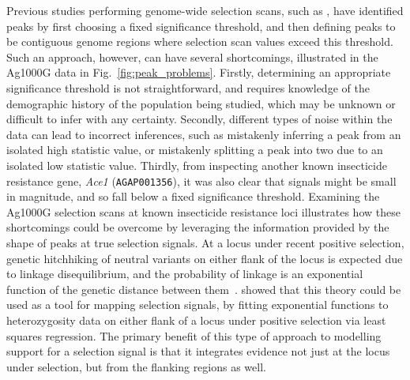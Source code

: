 \documentclass[a4paper,11pt,abstracton,hidelinks]{scrartcl}
\begin{document}
Previous studies performing genome-wide selection scans, such as \textcite{Garud2015}, have identified peaks by first choosing a fixed significance threshold, and then defining peaks to be contiguous genome regions where selection scan values exceed this threshold.
%
Such an approach, however, can have several shortcomings, illustrated in the Ag1000G data in Fig.~\ref{fig:peak_problems}.
%
Firstly, determining an appropriate significance threshold is not straightforward, and requires knowledge of the demographic history of the population being studied, which may be unknown or difficult to infer with any certainty.
%
Secondly, different types of noise within the data can lead to incorrect inferences, such as mistakenly inferring a peak from an isolated high statistic value, or mistakenly splitting a peak into two due to an isolated low statistic value.
%
Thirdly, from inspecting another known insecticide resistance gene, \textit{Ace1} (\texttt{AGAP001356}), it was also clear that signals might be small in magnitude, and so fall below a fixed significance threshold.
%
Examining the Ag1000G selection scans at known insecticide resistance loci illustrates how these shortcomings could be overcome by leveraging the information provided by the shape of peaks at true selection signals.
%
At a locus under recent positive selection, genetic hitchhiking of neutral variants on either flank of the locus is expected due to linkage disequilibrium, and the probability of linkage is an exponential function of the genetic distance between them~\parencite{MaynardSmith1974}.
%
\textcite{Wiener2011} showed that this theory could be used as a tool for mapping selection signals, by fitting exponential functions to heterozygosity data on either flank of a locus under positive selection via least squares regression.
%
The primary benefit of this type of approach to modelling support for a selection signal is that it integrates evidence not just at the locus under selection, but from the flanking regions as well.
%
\end{document}
